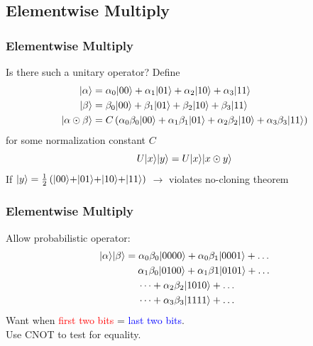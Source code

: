 \documentclass[
	11pt, %
]{beamer}
\begin{document}

\subsection{Elementwise Multiply}
\begin{frame}
    \frametitle{Elementwise Multiply}
    Is there such a unitary operator? Define
    \begin{align*}
        \rvert\alpha\rangle             & = \alpha_0\rvert00\rangle + \alpha_1\rvert01\rangle + \alpha_2\rvert10\rangle + \alpha_3\rvert11\rangle                                           \\
        \rvert\beta\rangle              & = \beta_0\rvert00\rangle + \beta_1\rvert01\rangle + \beta_2\rvert10\rangle + \beta_3\rvert11\rangle                                               \\
        \rvert\alpha \odot \beta\rangle & = C\left(\alpha_0\beta_0\rvert00\rangle + \alpha_1\beta_1\rvert01\rangle + \alpha_2\beta_2\rvert10\rangle + \alpha_3\beta_3\rvert11\rangle\right)
    \end{align*}
    for some normalization constant $C$
    \[
        U\rvert x\rangle\rvert y\rangle = U\rvert x\rangle\rvert x \odot y\rangle
    \]
    If $\rvert y\rangle = \frac{1}{2} \left(\rvert00\rangle + \rvert01\rangle + \rvert10\rangle + \rvert11\rangle\right)$ $\longrightarrow$ violates \alert{no-cloning theorem}
\end{frame}


\begin{frame}
    \frametitle{Elementwise Multiply}
    Allow probabilistic operator:
    \begin{align*}
        \rvert\alpha\rangle\rvert\beta\rangle & = \alpha_0\beta_0 \rvert0000\rangle + \alpha_0\beta_1\rvert0001\rangle + \dots               \\
                                & \hspace{0.45cm} \alpha_1\beta_0\rvert0100\rangle + \alpha_1\beta{1}\rvert0101\rangle + \dots \\
                                & \hspace{0.45cm} \dots + \alpha_2\beta_2\rvert1010\rangle + \dots                      \\
                                & \hspace{0.45cm} \dots + \alpha_3\beta_3\rvert1111\rangle + \dots
    \end{align*}
    Want when \textcolor{red}{first two bits} = \textcolor{blue}{last two bits}.\\
    \bigskip
    Use CNOT to test for equality.
\end{frame}
\end{document}
